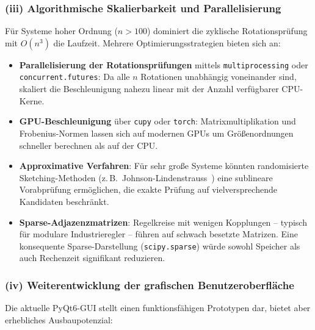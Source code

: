 \documentclass[a4paper,12pt]{article}
\theoremstyle{definition}
\begin{document}
\subsubsection*{(iii) Algorithmische Skalierbarkeit und Parallelisierung}

Für Systeme hoher Ordnung ($n > 100$) dominiert die zyklische Rotations\-prüfung
mit $O(n^3)$ die Laufzeit. Mehrere Optimierungsstrategien bieten sich an:

\begin{itemize}
    \item \textbf{Parallelisierung der Rotationsprüfungen} mittels
          \texttt{multiprocessing} oder \texttt{con\newline current.futures}: Da alle
          $n$ Rotationen unabhängig voneinander sind, skaliert die Be\-schleunigung
          nahezu linear mit der Anzahl verfügbarer CPU-Kerne.
    \item \textbf{GPU-Beschleunigung} über \texttt{cupy} oder \texttt{torch}:
          Matrixmultiplikation und Frobenius-Normen lassen sich auf modernen GPUs
          um Größenordnungen schneller berechnen als auf der CPU.
    \item \textbf{Approximative Verfahren}: Für sehr große Systeme könnten
          randomisierte Sket\-ching-Me\-thoden (z.\,B.\ Johnson-Lin\-den\-strauss~\cite{lindenstrauss}) eine
          sub\-lineare Vorab\-prüfung er\-möglichen, die exakte Prüfung auf
          viel\-versprechende Kandidaten beschränkt.
    \item \textbf{Sparse-Adjazenzmatrizen}: Regelkreise mit wenigen Kopplungen
          -- typisch für modulare Industrieregler -- führen auf schwach besetzte
          Matrizen. Eine konsequente Sparse-Darstellung (\texttt{scipy.sparse})
          würde sowohl Speicher als auch Rechenzeit signifikant reduzieren.
\end{itemize}

\subsubsection*{(iv) Weiterentwicklung der grafischen Benutzeroberfläche}

Die aktuelle PyQt6-GUI stellt einen funktionsfähigen Prototypen dar, bietet aber
erhebliches Ausbaupotenzial:
\end{document}
